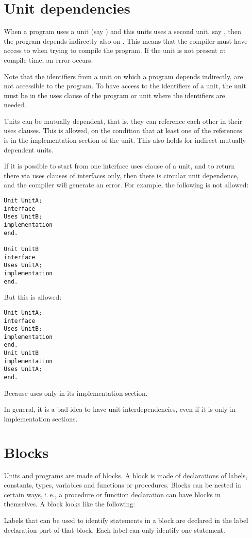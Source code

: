 \section{Unit dependencies}
When a program uses a unit (say ) and this units uses a second
unit, say , then the program depends indirectly also on
. This means that the compiler must have access to  when
trying to compile the program. If the unit is not present at compile time,
an error occurs.

Note that the identifiers from a unit on which a program depends indirectly,
are not accessible to the program. To have access to the identifiers of a
unit, the unit must be in the uses clause of the program or unit where the
identifiers are needed.

Units can be mutually dependent, that is, they can reference each other in
their uses clauses. This is allowed, on the condition that at least one of
the references is in the implementation section of the unit. This also holds
for indirect mutually dependent units.

If it is possible to start from one interface uses clause of a unit, and to return
there via uses clauses of interfaces only, then there is circular unit
dependence, and the compiler will generate an error.
For example, the following is not allowed:
\begin{verbatim}
Unit UnitA;
interface
Uses UnitB;
implementation
end.

Unit UnitB
interface
Uses UnitA;
implementation
end.
\end{verbatim}
But this is allowed:
\begin{verbatim}
Unit UnitA;
interface
Uses UnitB;
implementation
end.
Unit UnitB
implementation
Uses UnitA;
end.
\end{verbatim}
Because  uses  only in its implementation section.

In general, it is a bad idea to have unit interdependencies, even if it is
only in implementation sections.

\section{Blocks}
\label{se:blocks}
Units and programs are made of blocks. A block is made of declarations of
labels, constants, types, variables and functions or procedures. Blocks can
be nested in certain ways, i.\,e., a procedure or function declaration can
have blocks in themselves.
A block looks like the following:

Labels that can be used to identify statements in a block are declared in
the label declaration part of that block. Each label can only identify one
statement.

